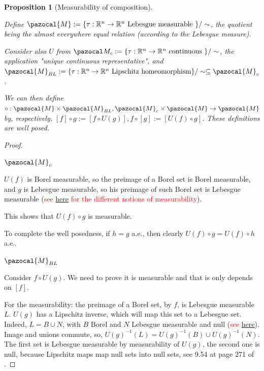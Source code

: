 \documentclass[english,a4paper,10pt,oneside]{scrbook}	%
\theoremstyle{break}
\newtheorem{prop}[equation]{Proposition}
\newenvironment{mproof}[1][\proofname]{%
  \begin{proof}[#1]$ $\par\nobreak\ignorespaces
}{%
  \end{proof}
}
\renewcommand*{\proofname}{Proof}
\theoremstyle{remark}
\newcommand{\mR}{\mathbb{R}}
\newcommand{\cT}{\pazocal{T}}
\begin{document}
\begin{prop}[Measurability of composition]
\label{prop:circ_wd}

Define $\pazocal{M}:=\{\tau: \mR^n \rightarrow \mR^n \text{ Lebesgue measurable } \}/\sim$, the quotient being the almost everywhere equal relation (according to the Lebesgue measure).

Consider also $U$ from $\pazocal M_c :=\{\tau: \mR^n \rightarrow \mR^n \text{ continuous } \}/\sim$, the application "unique continuous representative", and $\pazocal{M}_{BL} :=\{\tau: \mR^n \rightarrow \mR^n \text{ Lipschitz homeomorphism} \}/\sim \subseteq \pazocal{M}_c$.

We can then define $\circ:  \pazocal{M} \times \pazocal{M}_{BL}, \pazocal{M}_c \times \pazocal{M} \rightarrow \pazocal{M}$ by, respectively, $[f]\circ g := [f\circ U(g)], f \circ [g]:= [U(f)\circ g]$. These definitions are well posed.

\end{prop}
\begin{mproof}

\underline{$\pazocal{M}_c$}

$U(f)$ is Borel measurable, so the preimage of a Borel set is Borel measurable, and $g$ is Lebesgue measurable, so his preimage of such Borel set is Lebesgue measurable (\textcolor{red}{see \href{https://math.stackexchange.com/questions/283443/is-composition-of-measurable-functions-measurable}{here} for the different notions of measurability}).

This shows that $U(f)\circ g$ is measurable.

To complete the well posedness, if $h=g$ a.e., then clearly $U(f)\circ g= U(f)\circ  h$ a.e..

\underline{$\pazocal{M}_{BL}$}

Consider $f\circ U(g)$. We need to prove it is measurable and that is only depends on $[f]$.

For the measurability: the preimage of a Borel set, by $f$, is Lebesgue measurable $L$. $U(g)$ has a Lipschitz inverse, which will map this set to a Lebesgue set. Indeed, $L = B \cup N$, with $B$ Borel and $N$ Lebesgue measurable and null (\textcolor{red}{see \href{https://math.stackexchange.com/questions/3420145/lebesgue-measurable-set-union-of-borel-set-and-null-set}{here}}). Image and unions commute, so, $U(g)^{-1}(L) = U(g)^{-1}(B) \cup U(g)^{-1}(N)$. The first set is Lebesgue measurable by measurability of $U(g)$, the second one is null, because Lipschitz maps map null sets into null sets, see 9.54 at page 271 of \cite{leoni}. 


\end{mproof}
\end{document}
